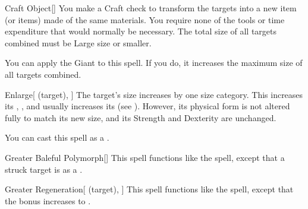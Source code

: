 \lowercase{\hypertarget{spell:Craft Object}{}}\label{spell:Craft Object}
\begin{freeability}[Rank 4]{\hypertarget{spell:Craft Object}{Craft Object}}[]
You make a Craft check to transform the targets into a new item (or items) made of the same materials.
You require none of the tools or time expenditure that would normally be necessary.
The total size of all targets combined must be Large size or smaller.

You can apply the Giant  to this spell.
If you do, it increases the maximum size of all targets combined.
\end{freeability}
\vspace{0.25em}



\lowercase{\hypertarget{spell:Enlarge}{}}\label{spell:Enlarge}
\begin{attuneability}[Rank 4]{\hypertarget{spell:Enlarge}{Enlarge}}[ (target), ]
The target's size increases by one size category.
This increases its , , and usually increases its  (see ).
However, its physical form is not altered fully to match its new size, and its Strength and Dexterity are unchanged.

You can cast this spell as a .
\end{attuneability}
\vspace{0.25em}



\lowercase{\hypertarget{spell:Greater Baleful Polymorph}{}}\label{spell:Greater Baleful Polymorph}
\begin{freeability}[Rank 5]{\hypertarget{spell:Greater Baleful Polymorph}{Greater Baleful Polymorph}}[]
This spell functions like the  spell, except that a struck target is  as a .
\end{freeability}
\vspace{0.25em}



\lowercase{\hypertarget{spell:Greater Regeneration}{}}\label{spell:Greater Regeneration}
\begin{attuneability}[Rank 5]{\hypertarget{spell:Greater Regeneration}{Greater Regeneration}}[ (target), ]
This spell functions like the  spell, except that the bonus increases to .
\end{attuneability}
\vspace{0.25em}



